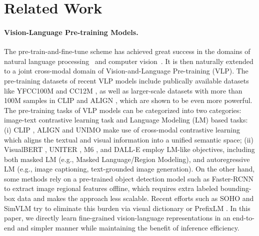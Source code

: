 \section{Related Work}
\paragraph{Vision-Language Pre-training Models.} The pre-train-and-fine-tune scheme has achieved great success in the domains of natural language processing~\citep{devlin2018bert,brown2020language} and computer vision~\citep{dosovitskiy2020image}.
It is then naturally extended to a joint cross-modal domain of 
Vision-and-Language Pre-training (VLP). 
The pre-training datasets of recent VLP models 
include publically available 
datasets 
like YFCC100M \citep{thomee2016yfcc100m} and CC12M \citep{changpinyo2021cc12m}, as well as 
larger-scale datasets with more than 100M samples
in CLIP \citep{radford2021learning} and ALIGN \citep{jia2021scaling}, which are shown to be even more powerful. 
The pre-training tasks of VLP models can be categorized into two categories: image-text contrastive learning task and Language Modeling (LM) based tasks:
(i) CLIP \citep{radford2021learning}, ALIGN \citep{jia2021scaling} and UNIMO \citep{li2020unimo} make use of cross-modal contrastive learning which aligns the textual and visual information into a unified semantic space; (ii) VisualBERT \citep{li2019visualbert}, UNITER \citep{chen2020uniter}, M6 \citep{lin2021m6}, and DALL-E \citep{ramesh2021zeroshot} employ LM-like objectives, including both masked LM (e.g., Masked Language/Region Modeling), and autoregressive LM (e.g., image captioning, text-grounded image generation).
On the other hand, some methods rely on a pre-trained object detection model such as Faster-RCNN \citep{ren2015faster} to extract image regional
features offline, which requires extra labeled bounding-box data and makes the approach less scalable.
Recent efforts such as SOHO \citep{huang2021seeing} and SimVLM \citep{wang2021simvlm} try to eliminate this burden via visual dictionary or PrefixLM 
\citep{raffel2020exploring}. 
In this paper, we 
 directly 
learn fine-grained vision-language representations
in an end-to-end and simpler manner while maintaining the benefit of inference efficiency.


